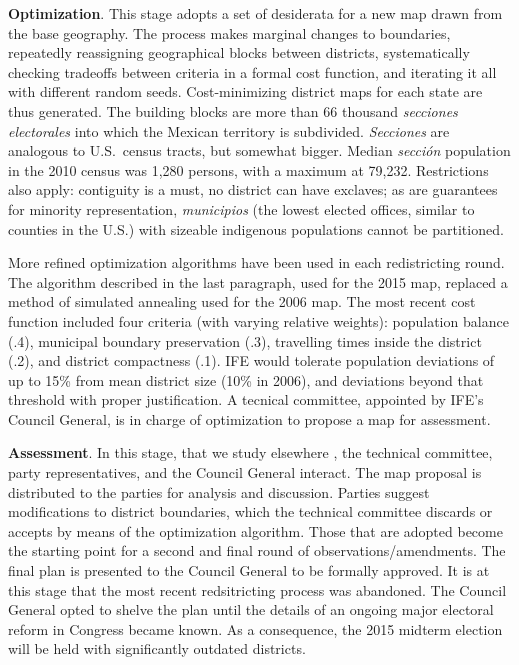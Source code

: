 \documentclass[letter,12pt]{article}
\begin{document}
\textbf{Optimization}. This stage adopts a set of desiderata for a new map drawn from the base geography. The process makes marginal changes to boundaries, repeatedly reassigning geographical blocks between districts, systematically checking tradeoffs between criteria in a formal cost function, and iterating it all with different random seeds. Cost-minimizing district maps for each state are thus generated. The building blocks are more than 66 thousand \emph{secciones electorales} into which the Mexican territory is subdivided. \emph{Secciones} are analogous to U.S.\ census tracts, but somewhat bigger. Median \emph{secci\'on} population in the 2010 census was 1,280 persons, with a maximum at 79,232. Restrictions also apply: contiguity is a must, no district can have exclaves; as are guarantees for minority representation, \emph{municipios} (the lowest elected offices, similar to counties in the U.S.) with sizeable indigenous populations cannot be partitioned. 

More refined optimization algorithms have been used in each redistricting round. The algorithm described in the last paragraph, used for the 2015 map, replaced a method of simulated annealing used for the 2006 map. The most recent cost function included four criteria (with varying relative weights): population balance (.4), municipal boundary preservation (.3), travelling times inside the district (.2), and district compactness (.1). IFE would tolerate population deviations of up to 15\% from mean district size (10\% in 2006), and deviations beyond that threshold with proper justification. A tecnical committee, appointed by IFE's Council General, is in charge of optimization to propose a map for assessment. 

\textbf{Assessment}. In this stage, that we study elsewhere \citep{altman.magar.mcd.trelles2014apsa}, the technical committee, party representatives, and the Council General interact. The map proposal is distributed to the parties for analysis and discussion. Parties suggest modifications to district boundaries, which the technical committee discards or accepts by means of the optimization algorithm. Those that are adopted become the starting point for a second and final round of observations/amendments. The final plan is presented to the Council General to be formally approved. It is at this stage that the most recent redsitricting process was abandoned. The Council General opted to shelve the plan until the details of an ongoing major electoral reform in Congress became known. As a consequence, the 2015 midterm election will be held with significantly outdated districts. 
\end{document}
